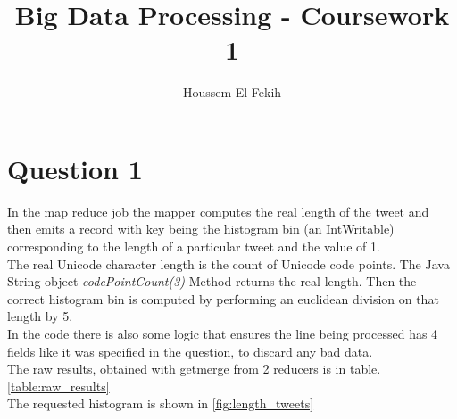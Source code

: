 \documentclass[12pt]{article}
\begin{document}
	
\author{Houssem El Fekih}
\title{Big Data Processing - Coursework 1}
\maketitle

\section{Question 1}
In the map reduce job the mapper computes the real length of the tweet and then emits a record with key being the histogram bin (an IntWritable) corresponding to the length of a particular tweet and the value of 1. \\
The real Unicode character length is the count of Unicode code points.
The Java String object \emph{codePointCount(3)} Method returns the real length.
Then the correct histogram bin is computed by performing an euclidean division on that length by 5. \\
In the code there is also some logic that ensures the line being processed has 4 fields like it was specified in the question, to discard any bad data. \\
The raw results, obtained with getmerge from 2 reducers is in table. \ref{table:raw_results} \\
The requested histogram is shown in \ref{fig:length_tweets}
\end{document}
